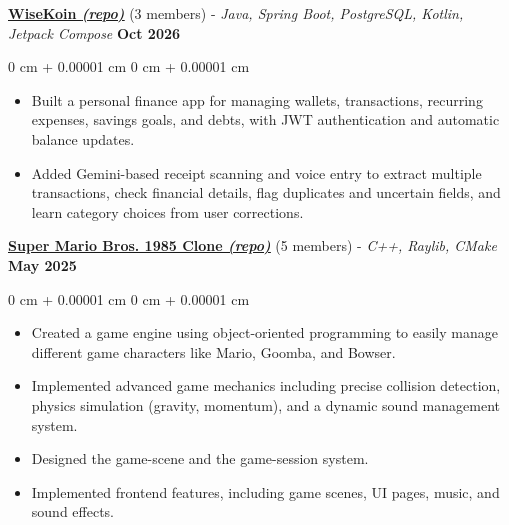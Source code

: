 \documentclass[9pt, letterpaper]{extarticle}
\newenvironment{highlights}{
    \begin{itemize}[
    topsep=2pt,
    itemsep=2pt,
    parsep=0pt,
    partopsep=0pt,
    leftmargin=10pt
]
}{
    \end{itemize}
} %
\newenvironment{onecolentry}{
    \begin{adjustwidth}{
        0 cm + 0.00001 cm
    }{
        0 cm + 0.00001 cm
    }
}{
    \end{adjustwidth}
} %
\begin{document}
    \vspace{0.2cm}

    \underline{\textbf{WiseKoin \href{https://github.com/WiseKoin/Backend}{\textit{(\textcolor{customred}{repo})}}}} (3 members) - \textit{Java, Spring Boot, PostgreSQL, Kotlin, Jetpack Compose}
    \hfill
    \textbf{Oct 2026}

    \vspace{0.10 cm}
        
    \begin{onecolentry}
        \begin{highlights}
            \item Built a personal finance app for managing wallets, transactions, recurring expenses, savings goals, and debts, with JWT authentication and automatic balance updates.
            \item Added Gemini-based receipt scanning and voice entry to extract multiple transactions, check financial details, flag duplicates and uncertain fields, and learn category choices from user corrections.
        \end{highlights}
    \end{onecolentry}

    \vspace{0.2cm}

    \underline{\textbf{Super Mario Bros. 1985 Clone \href{https://github.com/Tnina2612/Mario-CS202}{\textit{(\textcolor{customred}{repo})}}}} (5 members) - \textit{C++, Raylib, CMake}
    \hfill
    \textbf{May 2025}

    \vspace{0.10 cm}
    
    \begin{onecolentry}
        \begin{highlights}
            \item Created a game engine using object-oriented programming to easily manage different game characters like Mario, Goomba, and Bowser.
            \item Implemented advanced game mechanics including precise collision detection, physics simulation (gravity, momentum), and a dynamic sound management system.
            \item Designed the game-scene and the game-session system.
            \item Implemented frontend features, including game scenes, UI pages, music, and sound effects.
        \end{highlights}
    \end{onecolentry}
    
\end{document}
